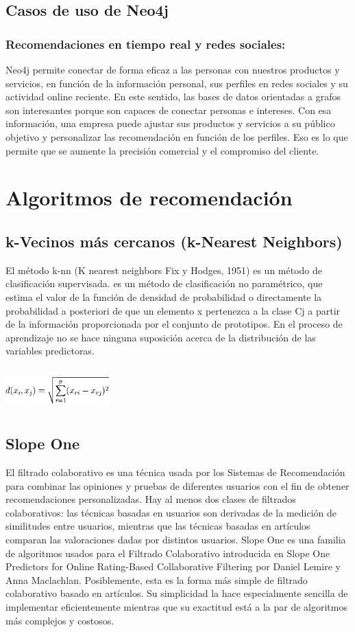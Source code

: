 \subsection{Casos de uso de Neo4j}
\subsubsection{Recomendaciones en tiempo real y redes sociales:}
	Neo4j permite conectar de forma eficaz a las personas con nuestros productos y servicios, en función de la información personal, sus perfiles en redes sociales y su actividad online reciente. En este sentido, las bases de datos orientadas a grafos son interesantes porque son capaces de conectar personas e intereses.
	Con esa información, una empresa puede ajustar sus productos y servicios a su público objetivo y personalizar las recomendación en función de los perfiles. Eso es lo que permite que se aumente la precisión comercial y el compromiso del cliente.\cite{25}
\newpage
\section{Algoritmos de recomendación}
\subsection{k-Vecinos más cercanos (k-Nearest Neighbors)}
	El método k-nn (K nearest neighbors Fix y Hodges, 1951) es un método de clasificación supervisada. es un método de clasificación no paramétrico, que estima el valor de la función de densidad de probabilidad o directamente la probabilidad a posteriori de que un elemento x pertenezca a la clase Cj a partir de la información proporcionada por el conjunto de prototipos. En el proceso de aprendizaje no se hace ninguna suposición acerca de la distribución de las variables predictoras.\\ 
	\\
\includegraphics[width=0.3\textwidth, height=15mm]{images/formula}
\subsection{Slope One}
	El filtrado colaborativo es una técnica usada por los Sistemas de Recomendación para combinar las opiniones y pruebas de diferentes usuarios con el fin de obtener recomendaciones personalizadas. Hay al menos dos clases de filtrados colaborativos: las técnicas basadas en usuarios son derivadas de la medición de similitudes entre usuarios, mientras que las técnicas basadas en artículos comparan las valoraciones dadas por distintos usuarios. Slope One es una familia de algoritmos usados para el Filtrado Colaborativo introducida en Slope One Predictors for Online Rating-Based Collaborative Filtering por Daniel Lemire y Anna Maclachlan. Posiblemente, esta es la forma más simple de filtrado colaborativo basado en artículos. Su simplicidad la hace especialmente sencilla de implementar eficientemente mientras que su exactitud está a la par de algoritmos más complejos y costosos.
